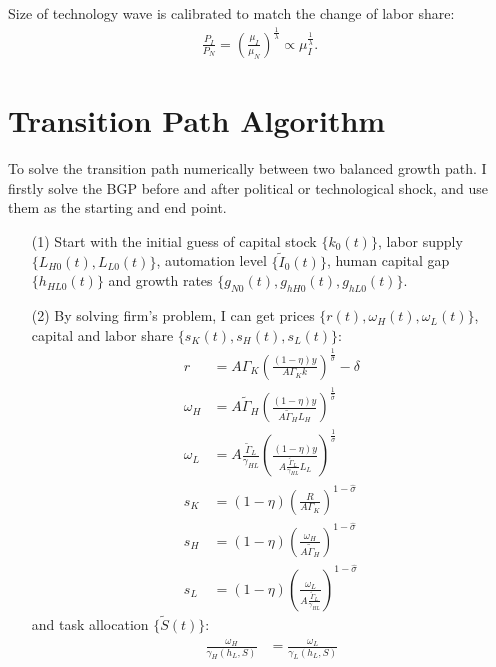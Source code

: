 \documentclass[12pt]{article}
\begin{document}
\begin{appendices}
Size of technology wave is calibrated to match the change of labor share:
\begin{align*}
\frac{P_I}{P_N} =(\frac{\mu_I}{\mu_N})^{\frac{1}{\lambda}} \propto \mu_I^{\frac{1}{\lambda}}.
\end{align*}

\section{Transition Path Algorithm}

To solve the transition path numerically between two balanced growth path. I firstly solve the BGP before and after political or technological shock, and use them as the starting and end point. 

\begin{itemize}
\item[(1)] Start with the initial guess of capital stock $\{k_0(t)\}$, labor supply $\{L_{H0}(t), L_{L0}(t)\}$, automation level $\{\tilde{I}_0(t)\}$, human capital gap $\{h_{HL0}(t)\}$ and growth rates $\{g_{N0}(t),g_{hH0}(t),g_{hL0}(t)\}$. 


\item[(2)] By solving firm's problem, I can get prices $\{r(t),\omega_H(t),\omega_L(t)\}$, capital and labor share $\{s_K(t),s_H(t),s_L(t)\}$:
\begin{align*}
r &= A \Gamma_K(\frac{(1-\eta)y}{A\Gamma_Kk})^{\frac{1}{\hat{\sigma}}}-\delta \\
\omega_H &= A \tilde{\Gamma}_H(\frac{(1-\eta)y}{A\tilde{\Gamma}_HL_H})^{\frac{1}{\hat{\sigma}}} \\
\omega_L &= A \frac{\tilde{\Gamma}_L}{\gamma_{HL}}(\frac{(1-\eta)y}{A\frac{\tilde{\Gamma}_L}{\gamma_{HL}}L_L})^{\frac{1}{\hat{\sigma}}} \\
s_K &= (1-\eta)(\frac{R}{A\Gamma_K})^{1-\hat{\sigma}} \\
s_H &= (1-\eta)(\frac{\omega_H}{A \tilde{\Gamma}_H})^{1-\hat{\sigma}} \\
s_L &= (1-\eta)(\frac{\omega_L}{A \frac{\tilde{\Gamma}_L}{\gamma_{HL}}})^{1-\hat{\sigma}} 
\end{align*}
and task allocation $\{\tilde{S}(t)\}$: 
\begin{align*}
\frac{\omega_H}{\gamma_H(h_L,S)} &= \frac{\omega_L}{\gamma_L(h_L,S)}
\end{align*}


\end{itemize}
\end{appendices}
\end{document}
